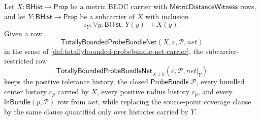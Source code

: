 \begin{definition}
\label{def:totallybounded-probebundle-net-subcarrier-restriction}
Let $X:\mathsf{BHist}\to\mathsf{Prop}$ be a metric BEDC carrier with
$\mathsf{MetricDistanceWitness}$ rows, and let
$Y:\mathsf{BHist}\to\mathsf{Prop}$ be a subcarrier of $X$ with inclusion
$$
\iota_Y:\forall y:\mathsf{BHist}.\;Y(y)\to X(y).
$$
Given a row
$$
\mathsf{TotallyBoundedProbeBundleNet}(X,\varepsilon,\mathcal{P},net)
$$
in the sense of \autoref{def:totallybounded-probebundle-net-carrier}, the
subcarrier-restricted row
$$
\mathsf{TotallyBoundedProbeBundleNet}_{X\downarrow Y}(\varepsilon,\mathcal{P},net|_Y)
$$
keeps the positive tolerance history, the closed $\mathsf{ProbeBundle}$
$\mathcal{P}$, every bundled center history $c_p$ carried by $X$, every
positive radius history $r_p$, and every $\mathsf{InBundle}(p,\mathcal{P})$
row from $net$, while replacing the source-point coverage clause by the same
clause quantified only over histories carried by $Y$.
\end{definition}

